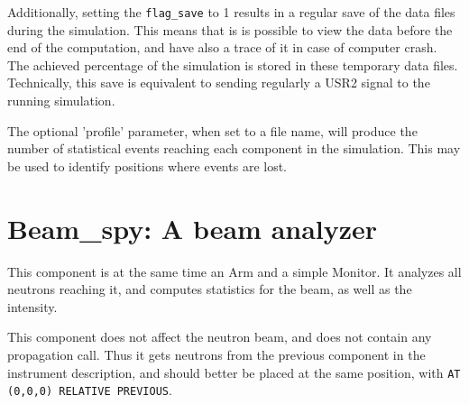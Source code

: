 Additionally, setting the \verb+flag_save+ to 1 results in
a regular save of the data files during the simulation.
This means that is is possible to view the data before the end
of the computation, and have also a trace of it in case of
computer crash. The achieved percentage of the simulation is stored in these temporary
data files. Technically, this save is equivalent to sending regularly
a USR2 signal to the running simulation.

The optional 'profile' parameter, when set to a file name, will produce the number of statistical events reaching each component in the simulation. This may be used to identify positions where events are lost.

\section{Beam\_spy: A beam analyzer}

This component is at the same time an Arm and a simple Monitor. It analyzes all neutrons reaching it, and computes statistics for the beam, as well as the intensity.

This component does not affect the neutron beam, and does not contain any propagation call. Thus it gets neutrons from the previous component in the instrument description, and should better be placed at the same position, with \verb+AT (0,0,0) RELATIVE PREVIOUS+.
